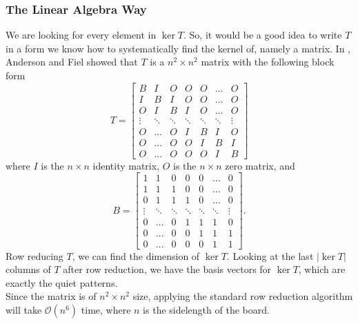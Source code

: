 \documentclass[a4paper]{article}
\renewcommand{\O}{\mathcal{O}}
\begin{document}
	\subsubsection{The Linear Algebra Way}
	We are looking for every element in $\ker T$.
	So, it would be a good idea to write $T$ in a form we know how to systematically find the kernel of, namely a matrix.
	In \cite{anderson_feil}, Anderson and Fiel showed that $T$ is a $n^2 \times n^2$ matrix with the following block form
	\begin{equation*}
		T = \begin{bmatrix}
			B & I & O & O & O & \dots & O \\
			I & B & I & O & O & \dots & O \\
			O & I & B & I & O & \dots & O \\
			\vdots & \ddots & \ddots & \ddots & \ddots & \ddots & \vdots \\
			O & \dots & O & I & B & I & O \\
			O & \dots & O & O & I & B & I \\
			O & \dots & O & O & O & I & B
		\end{bmatrix}
	\end{equation*}
	where $I$ is the $n \times n$ identity matrix, $O$ is the $n \times n$ zero matrix, and
	\begin{equation*}
		B = \begin{bmatrix}
			1 & 1 & 0 & 0 & 0 & \dots & 0 \\
			1 & 1 & 1 & 0 & 0 & \dots & 0 \\
			0 & 1 & 1 & 1 & 0 & \dots & 0 \\
			\vdots & \ddots & \ddots & \ddots & \ddots & \ddots & \vdots \\
			0 & \dots & 0 & 1 & 1 & 1 & 0 \\
			0 & \dots & 0 & 0 & 1 & 1 & 1 \\
			0 & \dots & 0 & 0 & 0 & 1 & 1
		\end{bmatrix}.
	\end{equation*}
	Row reducing $T$, we can find the dimension of $\ker T$.
	Looking at the last $\lvert \ker T \rvert$ columns of $T$ after row reduction, we have the basis vectors for $\ker T$, which are exactly the quiet patterns. \\
	
	Since the matrix is of $n^2 \times n^2$ size, applying the standard row reduction algorithm will take $\O(n^6)$ time, where $n$ is the sidelength of the board.
	
\end{document}
